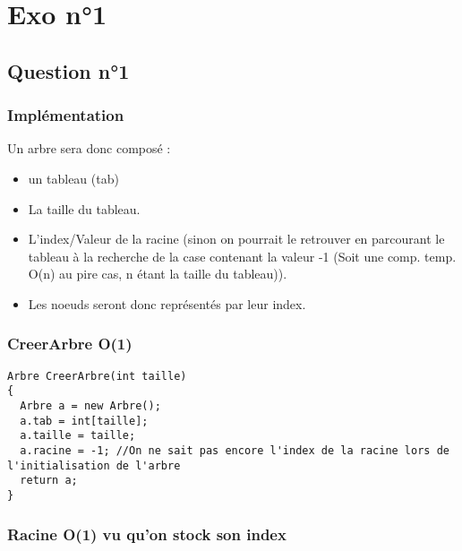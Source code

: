 \documentclass[11pt]{article}
\author{cliquot}
\date{\today}
\title{}
\begin{document}
\tableofcontents

\section{Exo n°1}
\label{sec:org342d7a2}

\subsection{Question n°1}
\label{sec:org2396f59}

\subsubsection{Implémentation}
\label{sec:orge7b5b9e}

Un arbre sera donc composé : 
\begin{itemize}
\item un tableau (tab)
\item La taille du tableau.
\item L'index/Valeur de la racine (sinon on pourrait le retrouver en parcourant le tableau à la recherche de la case contenant la valeur -1 (Soit une comp. temp. O(n) au pire cas, n étant la taille du tableau)).
\item Les noeuds seront donc représentés par leur index.
\end{itemize}

\subsubsection{CreerArbre O(1)}
\label{sec:org1bef875}

\begin{lstlisting}
Arbre CreerArbre(int taille)
{
  Arbre a = new Arbre();
  a.tab = int[taille];
  a.taille = taille;
  a.racine = -1; //On ne sait pas encore l'index de la racine lors de l'initialisation de l'arbre
  return a;
}
\end{lstlisting}

\subsubsection{Racine O(1) vu qu'on stock son index}
\label{sec:org4279b04}
\end{document}
